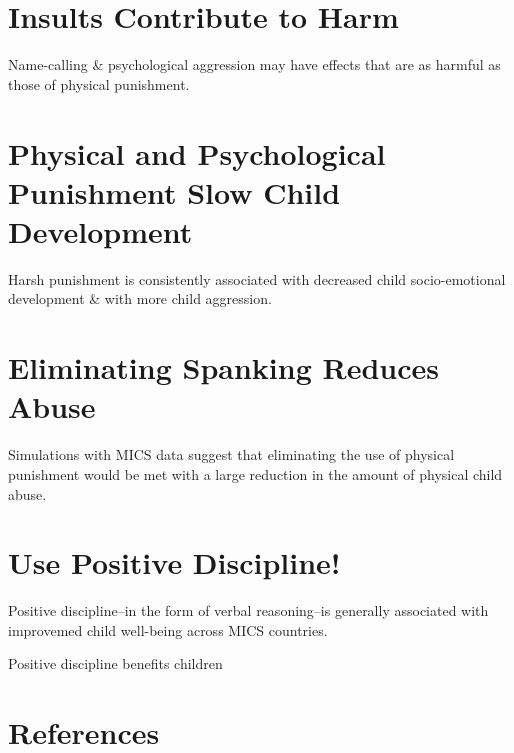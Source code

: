 \documentclass[
  letterpaper,
  DIV=11,
  numbers=noendperiod]{scrartcl}
\begin{document}
\hypertarget{insults-contribute-to-harm}{%
\section{Insults Contribute to Harm}\label{insults-contribute-to-harm}}

Name-calling \& psychological aggression may have effects that are as
harmful as those of physical punishment.

\hypertarget{physical-and-psychological-punishment-slow-child-development}{%
\section{Physical and Psychological Punishment Slow Child
Development}\label{physical-and-psychological-punishment-slow-child-development}}

Harsh punishment is consistently associated with decreased child
socio-emotional development \& with more child aggression.

\hypertarget{eliminating-spanking-reduces-abuse}{%
\section{Eliminating Spanking Reduces
Abuse}\label{eliminating-spanking-reduces-abuse}}

Simulations with MICS data suggest that eliminating the use of physical
punishment would be met with a large reduction in the amount of physical
child abuse.

\hypertarget{use-positive-discipline}{%
\section{Use Positive Discipline!}\label{use-positive-discipline}}

Positive discipline--in the form of verbal reasoning--is generally
associated with improvemed child well-being across MICS countries.

Positive discipline benefits children

\hypertarget{references}{%
\section*{References}\label{references}}
\end{document}
